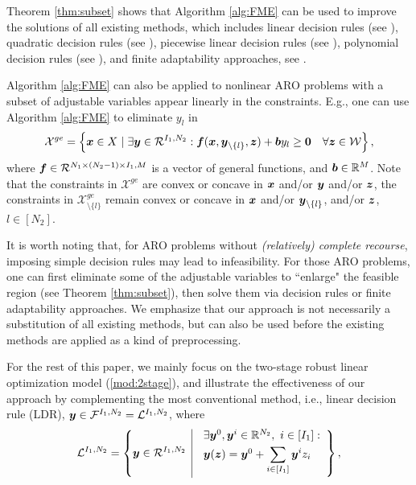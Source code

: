 \documentclass[fleqn,mnsc,blindrev]{informs4}
\newcommand{\mb}[1]{\mbox{\boldmath \ensuremath{#1}}}
\begin{document}
 {Theorem \ref{thm:subset} shows that Algorithm \ref{alg:FME} can be used to improve the solutions of all existing methods, which includes linear decision rules (see \cite{bggn04,cz09}),  quadratic decision rules (see \cite{ben09}), piecewise linear decision rules (see \cite{cssz08,cz09,bg15}),  polynomial decision rules (see \cite{bip11}), and finite adaptability approaches, see \cite{bd16a,pd16}. 

Algorithm \ref{alg:FME} can also be applied to nonlinear ARO problems with a subset of adjustable variables appear linearly in the constraints. E.g., one can use Algorithm \ref{alg:FME} to eliminate $y_l$ in 
\begin{equation*}
	\mathcal{X}^{ge} = \left\{ \mb{x} \in X \hspace{3pt} | \hspace{3pt}  \exists \mb{y} \in \mathcal{R}^{I_1,N_2}: \mb{f}(\mb{x}, \mb{y}_{\setminus \{l\}}, \mb{z}) + \mb{b} y_l \geq \mb{0}  \quad  \forall \mb{z} \in \mathcal{W} \right\},
\end{equation*}
where $\mb{f} \in \mathcal{R}^{N_1\times (N_2-1)\times I_1, M}$ is a vector of general functions, and  $\mb{b} \in \mathbb{R}^{M}$. Note that the constraints in $\mathcal{X}^{ge}$ are convex or concave in $\mb{x}$ and/or $\mb{y}$ and/or $\mb{z}$, the constraints in $\mathcal{X}^{ge}_{\setminus \{l\}}$ remain convex or concave in $\mb{x}$ and/or $\mb{y}_{\setminus \{l\}}$, and/or $\mb{z}$, $l\in [N_2]$.  

 {It is worth noting that, for ARO problems without \textit{(relatively) complete recourse}, imposing simple decision rules may lead to infeasibility. For those ARO problems, one can first eliminate some of the adjustable variables to ``enlarge" the feasible region (see Theorem \ref{thm:subset}), then solve them via decision rules or finite adaptability approaches.} We emphasize that our approach is not necessarily a substitution of all existing methods, but can also be used before the existing methods are applied as a kind of preprocessing.}   For the rest of this paper, we mainly focus on the two-stage robust linear optimization model (\ref{mod:2stage}), and illustrate the effectiveness of our approach by complementing the most conventional method, i.e., linear decision rule (LDR), $\mb{y} \in \mathcal{F}^{I_1,N_2} = \mathcal{L}^{I_1,N_2}$, where
\begin{equation*}
\mathcal{L}^{I_1,N_2} =\left\{
\mb{y} \in \mathcal{R}^{I_1, N_2} \enskip \vline \enskip  \begin{array}{l}
\exists \mb{y}^0, \mb{y}^{i} \in \mathbb{R}^{N_2}, ~ i\in [I_1] :  \vspace{3pt}\\
\mb{y}(\mb{z}) = \mb{y}^0 + \displaystyle \sum_{i\in [I_1]}\mb{y}^{i} z_i \vspace{3pt}
\end{array}
\right\},
\end{equation*}
\end{document}
